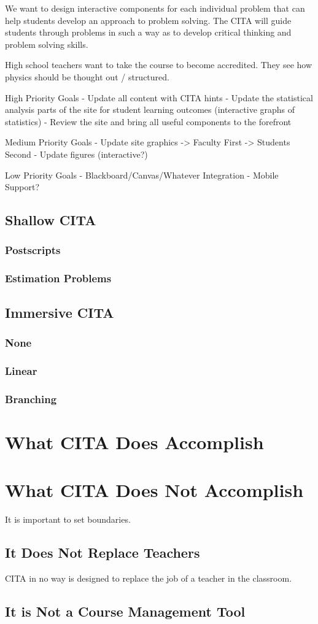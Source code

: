 We want to design interactive components for each individual problem that can help students develop an approach to problem solving.  The CITA will guide students through problems in such a way as to develop critical thinking and problem solving skills.

High school teachers want to take the course to become accredited.  They see how physics should be thought out / structured.

High Priority Goals
- Update all content with CITA hints
- Update the statistical analysis parts of the site for student learning outcomes (interactive graphs of statistics)
- Review the site and bring all useful components to the forefront

Medium Priority Goals
- Update site graphics
-> Faculty First
-> Students Second
- Update figures (interactive?)

Low Priority Goals
- Blackboard/Canvas/Whatever Integration
- Mobile Support?

\subsection{Shallow CITA}
\subsubsection{Postscripts}
\subsubsection{Estimation Problems}

\subsection{Immersive CITA}
\subsubsection{None}
\subsubsection{Linear}
\subsubsection{Branching}

\section{What CITA Does Accomplish}

\section{What CITA Does Not Accomplish}

It is important to set boundaries.

\subsection{It Does Not Replace Teachers}

CITA in no way is designed to replace the job of a teacher in the classroom.

\subsection{It is Not a Course Management Tool}